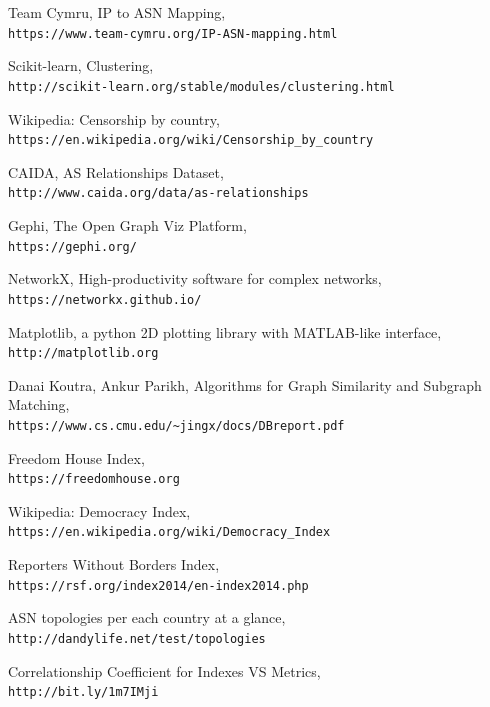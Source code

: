 \documentclass{article}
\begin{document}
\begin{thebibliography}{9}
Team Cymru, IP to ASN Mapping,
\\\texttt{https://www.team-cymru.org/IP-ASN-mapping.html}
 
Scikit-learn, Clustering,
\\\texttt{http://scikit-learn.org/stable/modules/clustering.html}
 
Wikipedia: Censorship by country,
\\\texttt{https://en.wikipedia.org/wiki/Censorship\_by\_country}

CAIDA, AS Relationships Dataset,
\\\texttt{http://www.caida.org/data/as-relationships}

Gephi, The Open Graph Viz Platform,
\\\texttt{https://gephi.org/}

NetworkX, High-productivity software for complex networks,
\\\texttt{https://networkx.github.io/}

Matplotlib, a python 2D plotting library with MATLAB-like interface,
\\\texttt{http://matplotlib.org}

Danai Koutra, Ankur Parikh, Algorithms for Graph Similarity and Subgraph Matching,
\\\texttt{https://www.cs.cmu.edu/\~{}jingx/docs/DBreport.pdf​}

Freedom House Index,
\\\texttt{https://freedomhouse.org}

Wikipedia: Democracy Index,
\\\texttt{https://en.wikipedia.org/wiki/Democracy\_Index}

Reporters Without Borders Index,
\\\texttt{https://rsf.org/index2014/en-index2014.php}

ASN topologies per each country at a glance,
\\\texttt{http://dandylife.net/test/topologies}

Correlationship Coefficient for Indexes VS Metrics,
\\\texttt{http://bit.ly/1m7IMji}

\end{thebibliography}
\end{document}
